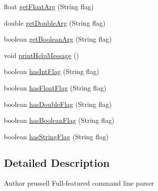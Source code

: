 \begin{DoxyCompactItemize}
\item 
float \hyperlink{classbroad_1_1core_1_1parser_1_1_command_line_parser_a89de2b3e47d77c6dc09daa4a229f56c5}{get\+Float\+Arg} (String flag)
\item 
double \hyperlink{classbroad_1_1core_1_1parser_1_1_command_line_parser_a1a12805a038827bca9e5a41c5df97933}{get\+Double\+Arg} (String flag)
\item 
boolean \hyperlink{classbroad_1_1core_1_1parser_1_1_command_line_parser_a5776bb75022365597c4f147f1c4f04d0}{get\+Boolean\+Arg} (String flag)
\item 
void \hyperlink{classbroad_1_1core_1_1parser_1_1_command_line_parser_ad387216e72c2cc5a458ccac68b460e79}{print\+Help\+Message} ()
\item 
boolean \hyperlink{classbroad_1_1core_1_1parser_1_1_command_line_parser_a81dfcfb569d1c60fec2bd19b535119b2}{has\+Int\+Flag} (String flag)
\item 
boolean \hyperlink{classbroad_1_1core_1_1parser_1_1_command_line_parser_adeedd0c0480dee53f0b695c615b89824}{has\+Float\+Flag} (String flag)
\item 
boolean \hyperlink{classbroad_1_1core_1_1parser_1_1_command_line_parser_ad8f3fa6cc1fa884cee17853180acb322}{has\+Double\+Flag} (String flag)
\item 
boolean \hyperlink{classbroad_1_1core_1_1parser_1_1_command_line_parser_a842eb76d7d79688703849248f6dd6d8d}{has\+Boolean\+Flag} (String flag)
\item 
boolean \hyperlink{classbroad_1_1core_1_1parser_1_1_command_line_parser_a215f7315d6a61a4755b3ddc3a9a198a7}{has\+String\+Flag} (String flag)
\end{DoxyCompactItemize}


\subsection{Detailed Description}
\begin{DoxyAuthor}{Author}
prussell Full-\/featured command line parser 
\end{DoxyAuthor}


